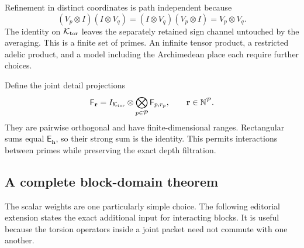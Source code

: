 Refinement in distinct coordinates is path independent because
\[
 (V_p\otimes I)(I\otimes V_q)
 =(I\otimes V_q)(V_p\otimes I)=V_p\otimes V_q.
\]
The identity on $\mathcal K_{\mathrm{tor}}$ leaves the separately retained sign
channel untouched by the averaging. This is a finite set of primes.
An infinite tensor product, a restricted adelic product, and a model
including the Archimedean place each require further choices.

Define the joint detail projections
\begin{equation}
 \mathsf F_{\mathbf r}
 =I_{\mathcal K_{\mathrm{tor}}}\otimes
 \bigotimes_{p\in\mathcal P}\mathsf F_{p,r_p},
 \qquad \mathbf r\in\mathbb N^{\mathcal P}.
 \label{a-limit-joint-details}
\end{equation}
They are pairwise orthogonal and have finite-dimensional ranges.
Rectangular sums equal $\mathsf E_{\mathbf h}$, so their strong sum is
the identity. This permits interactions between primes while preserving
the exact depth filtration.

\subsection{A complete block-domain theorem}

The scalar weights are one particularly simple choice. The following
editorial extension states the exact additional input for interacting
blocks. It is useful because the torsion operators inside a joint packet
need not commute with one another.

